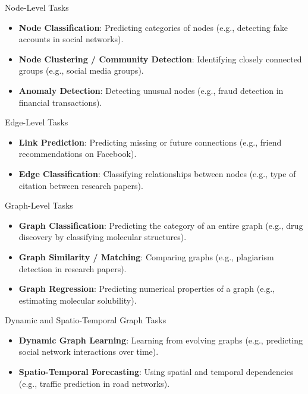 \documentclass{beamer}
\begin{document}
\begin{frame}{Node-Level Tasks}
    \begin{itemize}
        \item \textbf{Node Classification}: Predicting categories of nodes (e.g., detecting fake accounts in social networks).
        \item \textbf{Node Clustering / Community Detection}: Identifying closely connected groups (e.g., social media groups).
        \item \textbf{Anomaly Detection}: Detecting unusual nodes (e.g., fraud detection in financial transactions).
    \end{itemize}
\end{frame}

\begin{frame}{Edge-Level Tasks}
    \begin{itemize}
        \item \textbf{Link Prediction}: Predicting missing or future connections (e.g., friend recommendations on Facebook).
        \item \textbf{Edge Classification}: Classifying relationships between nodes (e.g., type of citation between research papers).
    \end{itemize}
\end{frame}

\begin{frame}{Graph-Level Tasks}
    \begin{itemize}
        \item \textbf{Graph Classification}: Predicting the category of an entire graph (e.g., drug discovery by classifying molecular structures).
        \item \textbf{Graph Similarity / Matching}: Comparing graphs (e.g., plagiarism detection in research papers).
        \item \textbf{Graph Regression}: Predicting numerical properties of a graph (e.g., estimating molecular solubility).
    \end{itemize}
\end{frame}

\begin{frame}{Dynamic and Spatio-Temporal Graph Tasks}
    \begin{itemize}
        \item \textbf{Dynamic Graph Learning}: Learning from evolving graphs (e.g., predicting social network interactions over time).
        \item \textbf{Spatio-Temporal Forecasting}: Using spatial and temporal dependencies (e.g., traffic prediction in road networks).
    \end{itemize}
\end{frame}
\end{document}
